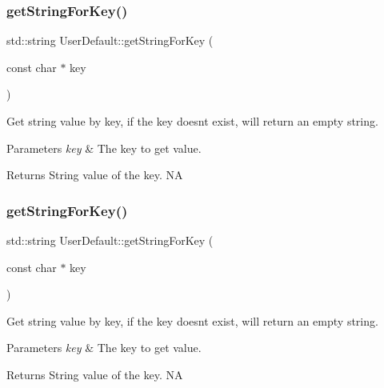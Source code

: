 \subsubsection{\texorpdfstring{get\+String\+For\+Key()}{getStringForKey()}\hspace{0.1cm}{\footnotesize\ttfamily [1/4]}}
{\footnotesize\ttfamily std\+::string User\+Default\+::get\+String\+For\+Key (\begin{DoxyParamCaption}\item[{const char $\ast$}]{key }\end{DoxyParamCaption})}

Get string value by key, if the key doesn\textquotesingle{}t exist, will return an empty string. 
\begin{DoxyParams}{Parameters}
{\em key} & The key to get value. \\
\hline
\end{DoxyParams}
\begin{DoxyReturn}{Returns}
String value of the key.  NA 
\end{DoxyReturn}
\mbox{\label{classUserDefault_afd5ed352bbd91dbe2c0c377ad31e8a59}} 
\subsubsection{\texorpdfstring{get\+String\+For\+Key()}{getStringForKey()}\hspace{0.1cm}{\footnotesize\ttfamily [2/4]}}
{\footnotesize\ttfamily std\+::string User\+Default\+::get\+String\+For\+Key (\begin{DoxyParamCaption}\item[{const char $\ast$}]{key }\end{DoxyParamCaption})}

Get string value by key, if the key doesn\textquotesingle{}t exist, will return an empty string. 
\begin{DoxyParams}{Parameters}
{\em key} & The key to get value. \\
\hline
\end{DoxyParams}
\begin{DoxyReturn}{Returns}
String value of the key.  NA 
\end{DoxyReturn}
\mbox{\label{classUserDefault_a3fdbb8a3fb13b1b2354b8b69cdf79a67}} 
